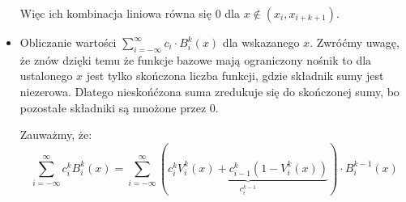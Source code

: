 \documentclass[hidelinks,a4paper,fleqn,oneside]{book}
\begin{document}
\begin{itemize}
	Więc ich kombinacja liniowa równa się $0$ dla $x \not\in (x_i, x_{i+k+1})$.
	
	\item Obliczanie wartości $\sum_{i=-\infty}^{\infty} c_i \cdot B_i^k(x)$ dla wskazanego $x$. Zwróćmy uwagę, że znów dzięki temu że funkcje bazowe mają ograniczony nośnik to dla ustalonego $x$ jest tylko skończona liczba funkcji, gdzie składnik sumy jest niezerowa. Dlatego nieskońćzona suma zredukuje się do skończonej sumy, bo pozostałe składniki są mnożone przez $0$.
	
	Zauważmy, że:
	\[
		\sum_{i=-\infty}^{\infty} c_i^k B_i^k(x) = \sum_{i=-\infty}^{\infty}(\underbrace{c_i^k V_i^k(x) + c_{i-1}^k(1-V_i^k(x))}_{c_i^{k-1}}) \cdot B_i^{k-1}(x)
	\]
\end{itemize}
\end{document}
